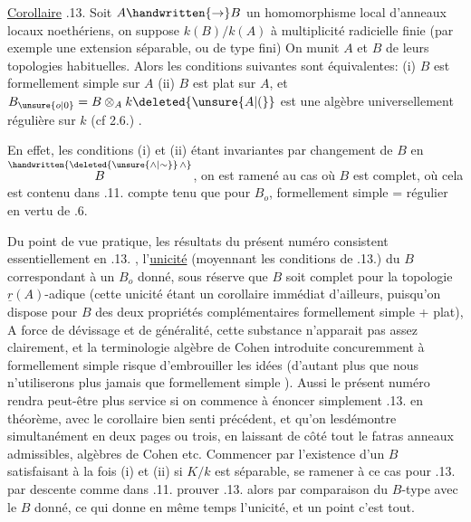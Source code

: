 
\uline{Corollaire} .13. Soit $A\handwritten{\to}B$ un homomorphisme local d'anneaux locaux noethériens, on suppose $k(B)/k(A)$ à multiplicité radicielle finie (par exemple une extension séparable, ou de type fini)\handwritten{,}  On munit $A$ et $B$ de leurs topologies habituelles. Alors les conditions suivantes sont équivalentes: (i) $B$ est formellement simple sur $A$ (ii) $B$ est plat sur $A$, et $B_{\unsure{o|0}}=B\otimes_A k\deleted{\unsure{A|(}}$ est une algèbre universellement régulière sur $k$ (cf 2.6.) .

En effet, les conditions (i) et (ii) étant invariantes par changement de $B$ en $\overset{\handwritten{\deleted{\unsure{\wedge|\sim}}\,\wedge}}{B}$, on est ramené au cas où $B$ est complet, où cela est contenu dans .11.  compte tenu que pour $B_o$, formellement simple =  régulier en vertu de .6.

Du point de vue pratique, les résultats du présent numéro consistent essentiellement en .13. ,  l'\uline{unicité}  (moyennant les conditions de .13.) du $B$ correspondant à un $B_o$ donné, sous réserve que $B$ soit complet pour la topologie $\underline{r}(A)$-adique (cette  unicité étant un corollaire immédiat d'ailleurs, puisqu'on dispose pour $B$ des deux propriétés complémentaires formellement simple + plat),  A force de dévissage et de généralité, cette substance n'apparait pas assez clairement, et la terminologie \textquotedbl{}algèbre de Cohen\textquotedbl{} introduite concuremment à \textquotedbl{}formellement simple\textquotedbl{} risque  d'embrouiller  les idées (d'autant plus que nous n'utiliserons plus jamais que \textquotedbl{}formellement simple\textquotedbl{} ). Aussi le présent numéro rendra peut-être plus service si on commence à énoncer simplement .13. en théorème, avec le corollaire bien senti précédent, et qu'on
lesdémontre simultanément en deux pages ou trois,  en laissant de côté tout le fatras anneaux admissibles, algèbres de Cohen etc.
Commencer par l'existence d'un $B$ satisfaisant à la fois (i) et (ii) si $K/k$ est séparable, se ramener à ce cas pour .13. par descente comme dans .11. prouver .13. alors par comparaison du $B$-type avec le $B$ donné, ce qui donne en même temps l'unicité, et un point c'est tout.
